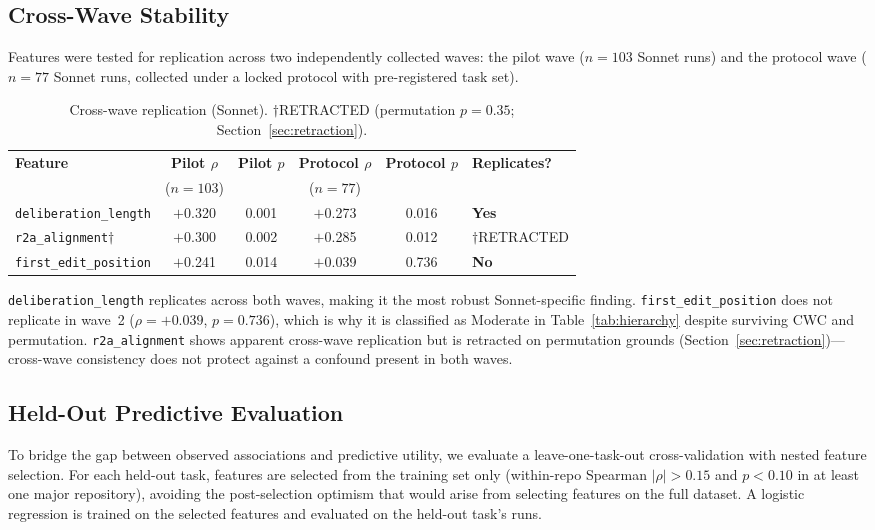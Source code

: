 \documentclass[11pt]{article}
\newcommand{\feat}[1]{\texttt{#1}}
\newcommand{\rtalign}{\feat{r2a\_alignment}}
\begin{document}
\subsection{Cross-Wave Stability}

Features were tested for replication across two independently collected waves: the pilot wave ($n = 103$ Sonnet runs) and the protocol wave ($n = 77$ Sonnet runs, collected under a locked protocol with pre-registered task set).

\begin{table}[t]
\centering
\caption{Cross-wave replication (Sonnet). $\dagger$RETRACTED (permutation $p = 0.35$; Section~\ref{sec:retraction}).}
\label{tab:crosswave}
\small
\begin{tabular}{lccccl}
\toprule
\textbf{Feature} & \textbf{Pilot $\rho$} & \textbf{Pilot $p$} & \textbf{Protocol $\rho$} & \textbf{Protocol $p$} & \textbf{Replicates?} \\
 & ($n{=}103$) & & ($n{=}77$) & & \\
\midrule
\feat{deliberation\_length} & $+$0.320 & 0.001 & $+$0.273 & 0.016 & \textbf{Yes} \\
\rtalign{}$\dagger$ & $+$0.300 & 0.002 & $+$0.285 & 0.012 & $\dagger$RETRACTED \\
\feat{first\_edit\_position} & $+$0.241 & 0.014 & $+$0.039 & 0.736 & \textbf{No} \\
\bottomrule
\end{tabular}
\end{table}

\feat{deliberation\_length} replicates across both waves, making it the most robust Sonnet-specific finding.
\feat{first\_edit\_position} does not replicate in wave~2 ($\rho = +0.039$, $p = 0.736$), which is why it is classified as Moderate in Table~\ref{tab:hierarchy} despite surviving CWC and permutation.
\rtalign{} shows apparent cross-wave replication but is retracted on permutation grounds (Section~\ref{sec:retraction})---cross-wave consistency does not protect against a confound present in both waves.


\subsection{Held-Out Predictive Evaluation}

To bridge the gap between observed associations and predictive utility, we evaluate a leave-one-task-out cross-validation with nested feature selection.
For each held-out task, features are selected from the training set only (within-repo Spearman $|\rho| > 0.15$ and $p < 0.10$ in at least one major repository), avoiding the post-selection optimism that would arise from selecting features on the full dataset.
A logistic regression is trained on the selected features and evaluated on the held-out task's runs.
\end{document}
